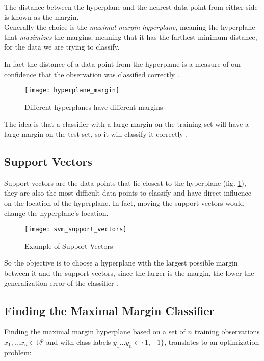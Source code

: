 The distance between the hyperplane and the nearest data point from either side is known as the margin.\\
Generally the choice is the \textit{maximal margin hyperplane}, meaning the hyperplane that \textit{maximizes} the margins, meaning that it has the farthest minimum distance, for the data we are trying to classify.

In fact the distance of a data point from the hyperplane is a measure of our confidence that the observation was classified correctly \cite{ISLR}.

\begin{figure}[H]
	\centering
	\texttt{[image: hyperplane\_margin]}
	\caption{Different hyperplanes have different margins \cite{svm_monkeylearn}}
\end{figure}

The idea is that a classifier with a large margin on the training set will have a large margin on the test set, so it will classify it correctly \cite{ISLR}.

\subsection{Support Vectors}
Support vectors are the data points that lie closest to the hyperplane (fig. \ref{fig:suppvec}), they are also the most difficult data points to classify and have direct influence on the location of the hyperplane. In fact, moving the support vectors would change the hyperplane's location.

\begin{figure}[H]
	\centering
	\texttt{[image: svm\_support\_vectors]}
	\caption{Example of Support Vectors}
	\label{fig:suppvec}
\end{figure}

So the objective is to choose a hyperplane with the largest possible margin between it and the support vectors, since the larger is the margin, the lower the generalization error of the classifier \cite{ISLR}.

\subsection{Finding the Maximal Margin Classifier}
Finding the maximal margin hyperplane based on a set of $n$ training observations $x_1, \dots x_n \in \mathbb{R}^p$ and with class labels $y_1 \dots y_n \in \{1, -1\}$, translates to an optimization problem:

